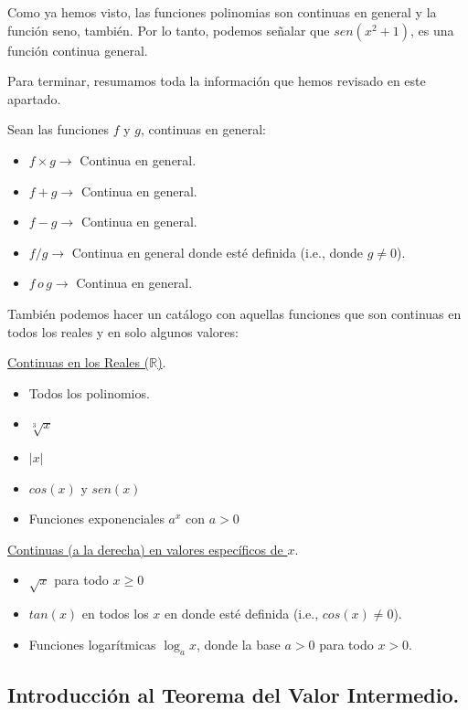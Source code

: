 \documentclass[12pt]{article}
\begin{document}
Como ya hemos visto, las funciones polinomias son continuas en general y la función seno, también. Por lo tanto, podemos señalar que $sen(x^{2} + 1)$, es una función continua general.

Para terminar, resumamos toda la información que hemos revisado en este apartado.

Sean las funciones $f$ y $g$, continuas en general:
\begin{itemize}
\item $f \times g \rightarrow$ Continua en general.
\item $f + g \rightarrow$ Continua en general.
\item $f - g \rightarrow$ Continua en general.
\item $f/g \rightarrow$ Continua en general donde esté definida (i.e., donde $g \neq 0$).
\item $f \, o \, g \rightarrow$ Continua en general.
\end{itemize}

También podemos hacer un catálogo con aquellas funciones que son continuas en todos los reales y en solo algunos valores:

\underline{Continuas en los Reales ($\mathbb{R}$)}.

\begin{itemize}
\item Todos los polinomios.
\item $\sqrt[3]{x}$
\item $|x|$
\item $cos(x)$ y $sen(x)$
\item Funciones exponenciales $a^{x}$ con $a > 0$
\end{itemize}

\underline{Continuas (a la derecha) en valores específicos de $x$}.

\begin{itemize}
\item $\sqrt{x}$ para todo $x \geq 0$
\item $tan(x)$ en todos los $x$ en donde esté definida (i.e., $cos(x)\neq 0$).
\item Funciones logarítmicas $\log_{a}x$, donde la base $a >0$ para todo $x > 0$.
\end{itemize}


\subsection{Introducción al Teorema del Valor Intermedio.}
\end{document}
